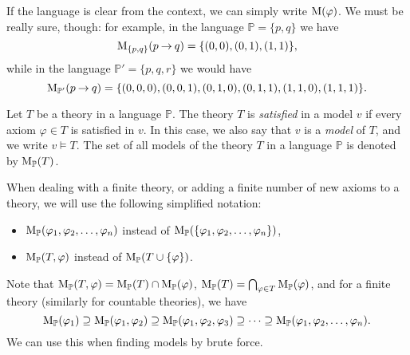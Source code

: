 If the language is clear from the context, we can simply write $\operatorname{M}(\varphi)$. We must be really sure, though: for example, in the language $\mathbb{P} = \{p,q\}$ we have 
$$
\operatorname{M}_{\{p,q\}}(p \mathbin{\rightarrow} q) = \{(0,0),(0,1),(1,1)\},
$$
while in the language $\mathbb{P}' = \{p,q,r\}$ we would have
$$
\operatorname{M}_{\mathbb{P}'}(p \mathbin{\rightarrow} q) = \{(0,0,0),(0,0,1),(0,1,0),(0,1,1),(1,1,0),(1,1,1)\}.
$$

\begin{definition}\label{definition:validity-of-theory}
    Let $T$ be a theory in a language $\mathbb P$. The theory $T$ is \emph{satisfied} in a model $v$ if every axiom $\varphi \in T$ is satisfied in $v$. In this case, we also say that $v$ is a \emph{model} of $T$, and we write $v \models T$. The set of all models of the theory $T$ in a language $\mathbb P$ is denoted by $\operatorname{M}_\mathbb P(T)$.    
\end{definition}

When dealing with a finite theory, or adding a finite number of new axioms to a theory, we will use the following simplified notation:
\begin{itemize}
    \item $\operatorname{M}_\mathbb{P}(\varphi_1, \varphi_2, \dots, \varphi_n)$ instead of $\operatorname{M}_\mathbb{P}(\{\varphi_1, \varphi_2, \dots, \varphi_n\})$,
    \item $\operatorname{M}_\mathbb{P}(T, \varphi)$ instead of $\operatorname{M}_\mathbb{P}(T \cup \{\varphi\})$.
\end{itemize}

Note that $\operatorname{M}_\mathbb{P}(T, \varphi) = \operatorname{M}_\mathbb{P}(T) \cap \operatorname{M}_\mathbb{P}(\varphi)$, $\operatorname{M}_\mathbb{P}(T) = \bigcap_{\varphi \in T} \operatorname{M}_\mathbb{P}(\varphi)$, and for a finite theory (similarly for countable theories), we have
$$
\operatorname{M}_\mathbb P(\varphi_1)\supseteq \operatorname{M}_\mathbb P(\varphi_1,\varphi_2)\supseteq \operatorname{M}_\mathbb P(\varphi_1,\varphi_2,\varphi_3)\supseteq\dots\supseteq\operatorname{M}_\mathbb P(\varphi_1,\varphi_2,\dots,\varphi_n).
$$
We can use this when finding models by brute force.

